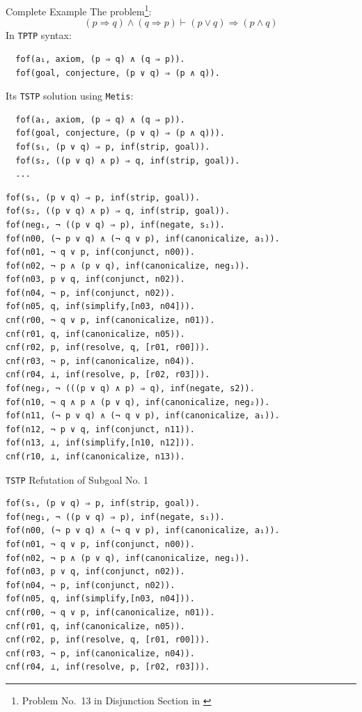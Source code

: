 \documentclass[10pt, xetex, hyperref={pdfpagelabels=false}]{beamer}
\newcommand{\prg}[1]{\texttt{#1}\xspace}
\newcommand{\Metis}{\prg{Metis}}
\newcommand{\len}[1]{\texttt{#1}\xspace}
\newcommand{\TPTP}{\len{TPTP}}
\newcommand{\TSTP}{\len{TSTP}}
\begin{document}
\begin{frame}[fragile]{Complete Example}
The problem\footnote{Problem No.~13 in Disjunction Section in \cite{Prieto-Cubides2017}}:
\begin{equation*}
(p \Rightarrow q) \wedge (q \Rightarrow p) ⊢ (p \vee q) \Rightarrow (p \wedge q)
\end{equation*}
In \TPTP syntax:
\begin{verbatim}
  fof(a₁, axiom, (p ⇒ q) ∧ (q ⇒ p)).
  fof(goal, conjecture, (p ∨ q) ⇒ (p ∧ q)).
\end{verbatim}
Its \TSTP solution using \Metis:
\begin{verbatim}
  fof(a₁, axiom, (p ⇒ q) ∧ (q ⇒ p)).
  fof(goal, conjecture, (p ∨ q) ⇒ (p ∧ q))).
  fof(s₁, (p ∨ q) ⇒ p, inf(strip, goal)).
  fof(s₂, ((p ∨ q) ∧ p) ⇒ q, inf(strip, goal)).
  ...
\end{verbatim}
\end{frame}

\begin{frame}
\begin{verbatim}
fof(s₁, (p ∨ q) ⇒ p, inf(strip, goal)).
fof(s₂, ((p ∨ q) ∧ p) ⇒ q, inf(strip, goal)).
fof(neg₁, ¬ ((p ∨ q) ⇒ p), inf(negate, s₁)).
fof(n00, (¬ p ∨ q) ∧ (¬ q ∨ p), inf(canonicalize, a₁)).
fof(n01, ¬ q ∨ p, inf(conjunct, n00)).
fof(n02, ¬ p ∧ (p ∨ q), inf(canonicalize, neg₁)).
fof(n03, p ∨ q, inf(conjunct, n02)).
fof(n04, ¬ p, inf(conjunct, n02)).
fof(n05, q, inf(simplify,[n03, n04])).
cnf(r00, ¬ q ∨ p, inf(canonicalize, n01)).
cnf(r01, q, inf(canonicalize, n05)).
cnf(r02, p, inf(resolve, q, [r01, r00])).
cnf(r03, ¬ p, inf(canonicalize, n04)).
cnf(r04, ⊥, inf(resolve, p, [r02, r03])).
fof(neg₂, ¬ (((p ∨ q) ∧ p) ⇒ q), inf(negate, s2)).
fof(n10, ¬ q ∧ p ∧ (p ∨ q), inf(canonicalize, neg₂)).
fof(n11, (¬ p ∨ q) ∧ (¬ q ∨ p), inf(canonicalize, a₁)).
fof(n12, ¬ p ∨ q, inf(conjunct, n11)).
fof(n13, ⊥, inf(simplify,[n10, n12])).
cnf(r10, ⊥, inf(canonicalize, n13)).
\end{verbatim}
\end{frame}

\begin{frame}[fragile]{\TSTP Refutation of Subgoal No. 1}
\begin{verbatim}
fof(s₁, (p ∨ q) ⇒ p, inf(strip, goal)).
fof(neg₁, ¬ ((p ∨ q) ⇒ p), inf(negate, s₁)).
fof(n00, (¬ p ∨ q) ∧ (¬ q ∨ p), inf(canonicalize, a₁)).
fof(n01, ¬ q ∨ p, inf(conjunct, n00)).
fof(n02, ¬ p ∧ (p ∨ q), inf(canonicalize, neg₁)).
fof(n03, p ∨ q, inf(conjunct, n02)).
fof(n04, ¬ p, inf(conjunct, n02)).
fof(n05, q, inf(simplify,[n03, n04])).
cnf(r00, ¬ q ∨ p, inf(canonicalize, n01)).
cnf(r01, q, inf(canonicalize, n05)).
cnf(r02, p, inf(resolve, q, [r01, r00])).
cnf(r03, ¬ p, inf(canonicalize, n04)).
cnf(r04, ⊥, inf(resolve, p, [r02, r03])).
\end{verbatim}
\end{frame}
\end{document}
